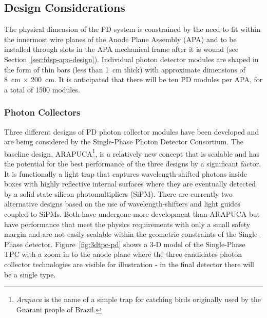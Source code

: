 \subsection{Design Considerations}
\label{sec:fdsp-pd-des-consid}

The physical dimension of the PD system is constrained by the need to fit within the innermost wire planes of the Anode Plane Assembly (APA) and to be installed through slots in the APA mechanical frame after it is wound (see Section~\ref{sec:fdsp-apa-design}). 
Individual photon detector modules are shaped in the form of thin bars (less than \SI{1}{cm} thick) with approximate dimensions of \SI{8}{cm} $\times$ \SI{200}{cm}. It is anticipated that there will be ten PD modules per APA, for a total of \num{1500} modules. 


\subsubsection{Photon Collectors} 
Three different designs of PD photon collector modules have been developed and are being considered by the Single-Phase Photon Detector Consortium. The baseline design, ARAPUCA\footnote{{\it Arapuca} is the name of a simple trap for catching birds originally used by the Guarani people of Brazil.}, is a relatively new concept that is scalable and has the potential for the best performance of the three designs by a significant factor. It is functionally a light trap that captures wavelength-shifted photons inside boxes with highly reflective internal surfaces where they are eventually detected by a solid state silicon photomultipliers (SiPM).  There are currently two alternative designs based on the use of wavelength-shifters and light guides coupled to SiPMs. Both have undergone more development than ARAPUCA but have performance that meet the physics requirements with only a small safety margin and are not easily scalable within the geometric constraints of the Single-Phase detector.
Figure~\ref{fig:3dtpc-pd} shows a 3-D model of the Single-Phase TPC with a zoom in to the anode plane where the three candidates photon collector technologies are visible for illustration - in the final detector there will be a single type.

